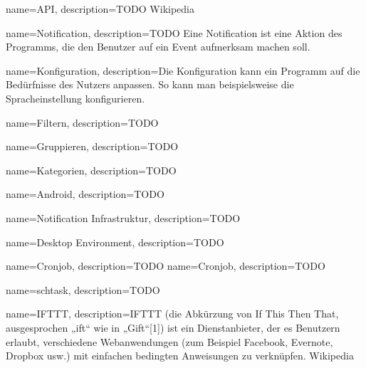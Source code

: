 {
  name=API,
  description={TODO Wikipedia}
} 

{
  name=Notification,
  description={TODO Eine Notification ist eine Aktion des Programms, die den Benutzer auf ein Event aufmerksam machen soll.}
} 

{
  name=Konfiguration,
  description={Die Konfiguration kann ein Programm auf die Bedürfnisse des Nutzers anpassen. So kann man beispielsweise die Spracheinstellung konfigurieren.}
} 

{
  name=Filtern,
  description={TODO}
} 

{
  name=Gruppieren,
  description={TODO}
} 

{
  name=Kategorien,
  description={TODO }
} 

{
  name=Android,
  description={TODO}
} 

{
  name=Notification Infrastruktur,
  description={TODO}
} 

{
  name=Desktop Environment,
  description={TODO}
} 

{
  name=Cronjob,
  description={TODO}
} 
{
  name=Cronjob,
  description={TODO}
} 

{
  name=schtask,
  description={TODO}
} 

{
  name=IFTTT,
  description={IFTTT (die Abkürzung von If This Then That, ausgesprochen „ift“ wie in „Gift“[1]) ist ein Dienstanbieter, der es Benutzern erlaubt, verschiedene Webanwendungen (zum Beispiel Facebook, Evernote, Dropbox usw.) mit einfachen bedingten Anweisungen zu verknüpfen. Wikipedia}
} 





